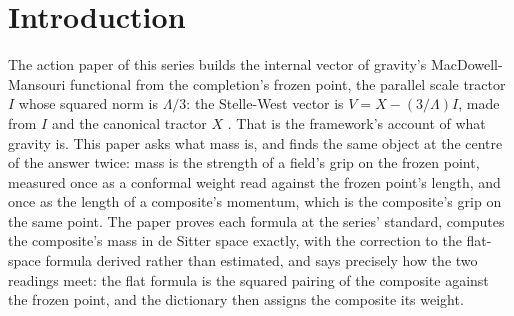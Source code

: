 \documentclass[11pt]{article}
\theoremstyle{definition}
\begin{document}
\newpage
\section{Introduction}\label{sec:intro}

The action paper of this series builds the internal vector of gravity's MacDowell-Mansouri functional from the completion's frozen point, the parallel scale tractor $I$ whose squared norm is $\Lambda/3$: the Stelle-West vector is $V = X - (3/\Lambda)I$, made from $I$ and the canonical tractor $X$ \cite{ButlerT10}. That is the framework's account of what gravity is. This paper asks what mass is, and finds the same object at the centre of the answer twice: mass is the strength of a field's grip on the frozen point, measured once as a conformal weight read against the frozen point's length, and once as the length of a composite's momentum, which is the composite's grip on the same point. The paper proves each formula at the series' standard, computes the composite's mass in de Sitter space exactly, with the correction to the flat-space formula derived rather than estimated, and says precisely how the two readings meet: the flat formula is the squared pairing of the composite against the frozen point, and the dictionary then assigns the composite its weight.
\end{document}
